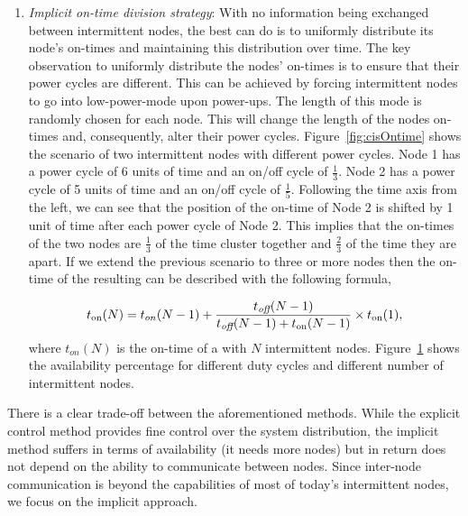\begin{enumerate}[label=\roman*.]
\begin{figure}
		\label{fig:cisModel}
\end{figure} 
%
		\item \textit{Implicit on-time division strategy}: With no information being exchanged between intermittent nodes, the best \sys can do is to uniformly distribute its node's on-times and maintaining this distribution over time. The key observation to uniformly distribute the nodes' on-times is to ensure that their power cycles are different. This can be achieved by forcing intermittent nodes to go into low-power-mode upon power-ups. The length of this mode is randomly chosen for each node. This will change the length of the nodes on-times and, consequently, alter their power cycles. Figure~\ref{fig:cisOntime} shows the scenario of two intermittent nodes with different power cycles. Node 1 has a power cycle of 6 units of time and an on/off cycle of $\frac{1}{3}$. Node 2 has a power cycle of 5 units of time and an on/off cycle of $\frac{1}{5}$. Following the time axis from the left, we can see that the position of the on-time of Node 2 is shifted by 1 unit of time after each power cycle of Node 2. This implies that the on-times of the two nodes are $\frac{1}{3}$ of the time cluster together and $\frac{2}{3}$ of the time they are apart. If we extend the previous scenario to three or more nodes then the on-time of the resulting \sys can be described with the following formula,
				
\begin{equation}
	t_\text{on}(N) = t_{on}(N-1) + \frac{t_\text{\it off}(N-1)}{t_\text{\it off}(N-1)+t_\text{on}(N-1)} \times t_\text{on}(1),
		\label{eq:cisModel}
\end{equation}
where $t_{on}(N)$ is the on-time of a \sys with $N$ intermittent nodes. Figure~\ref{fig:cisModel} shows the \sys availability percentage for different duty cycles and different number of intermittent nodes.
\end{enumerate}
%
There is a clear trade-off between the aforementioned methods. While the explicit control method provides fine control over the system distribution, the implicit method suffers in terms of availability (it needs more nodes) but in return does not depend on the ability to communicate between nodes. Since inter-node communication is beyond the capabilities of most of today's intermittent nodes, we focus on the implicit approach.

